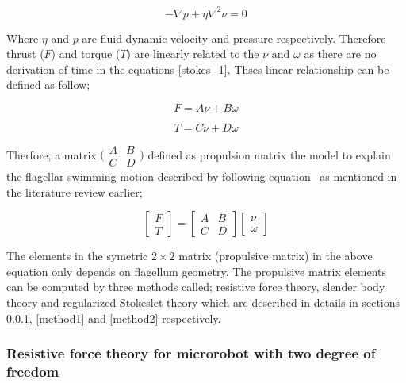 \documentclass[12pt,a4paper,titlepage]{report}
\begin{document}
\begin{equation}
  -\nabla{p}+ \eta\nabla^2{\nu}  = 0
\label{stokes_1}
\end{equation}

Where $\eta$ and $p$ are fluid dynamic velocity and pressure respectively. Therefore thrust ($F$) and 
torque ($T$) are linearly related to the $\nu$ and $\omega$ as there are no derivation of time in 
the equations \ref{stokes_1}. Thses linear relationship can be defined as follow;


\begin{equation}
  F  = A\nu + B\omega
\label{linear1}
\end{equation}

\begin{equation}
  T = C\nu + D\omega
\label{linear2}
\end{equation}


 Therfore, a matrix 
$\bigl(\begin{smallmatrix}
A&B\\ C&D
\end{smallmatrix} \bigr)$
 defined as propulsion matrix the
model to explain the flagellar swimming motion described by following equation~\citep{rodenborn2013propulsion}
as mentioned in the literature review earlier;
 

\[
\begin{bmatrix} F\\ 
T\end{bmatrix}  = \begin{bmatrix} A & B \\ 
C & D \end{bmatrix}  \begin{bmatrix} \nu
 \\ \omega
\end{bmatrix}
\]

The elements in the symetric $2\times2$ matrix (propulsive matrix) in the above equation only depends on 
flagellum geometry. The propulsive matrix elements can be computed by three methods called;
resistive force theory, slender body theory and regularized Stokeslet theory which are described in details in sections \ref{method3}, 
\ref{method1} and \ref{method2} respectively. 





\subsubsection{Resistive force theory for microrobot with two degree of freedom}\label{method3}
\end{document}
